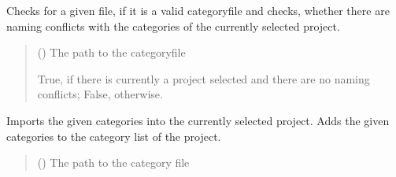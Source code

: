 \documentclass[letterpaper,10pt,english]{sphinxmanual}
\begin{document}
\begin{fulllineitems}
\begin{fulllineitems}
\begin{quote}
\begin{description}
\end{description}\end{quote}

\end{fulllineitems}


\begin{fulllineitems}
\label{\detokenize{apidoc/src.osm_configurator.control:src.osm_configurator.control.control.Control.check_conflicts_in_category_configuration}}
\pysigstartsignatures
{}
\pysigstopsignatures
\sphinxAtStartPar
Checks for a given file, if it is a valid category\sphinxhyphen{}file and checks, whether there are naming conflicts with the categories of the currently selected project.
\begin{quote}\begin{description}
\sphinxAtStartPar
{} () \textendash{} The path to the category\sphinxhyphen{}file

\sphinxAtStartPar
True, if there is currently a project selected and there are no naming conflicts; False, otherwise.

\sphinxAtStartPar
{}

\end{description}\end{quote}

\end{fulllineitems}


\begin{fulllineitems}
\label{\detokenize{apidoc/src.osm_configurator.control:src.osm_configurator.control.control.Control.import_category_configuration}}
\pysigstartsignatures
{}
\pysigstopsignatures
\sphinxAtStartPar
Imports the given categories into the currently selected project.
Adds the given categories to the category list of the project.
\begin{quote}\begin{description}
\sphinxAtStartPar
{} () \textendash{} The path to the category file


\end{description}
\end{quote}
\end{fulllineitems}
\end{fulllineitems}
\end{document}
